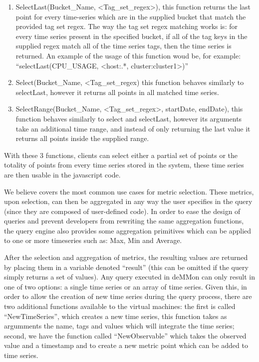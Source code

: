 \begin{enumerate}

    \item SelectLast(Bucket\_Name, <Tag\_set\_regex>), this function returns the last point for every time-series which are in the supplied bucket that match the provided tag set regex. The way the tag set regex matching works is: for every time series present in the specified bucket, if all of the tag keys in the supplied regex match all of the time series tags, then the time series is returned. An example of the usage of this function woud be, for example: ``selectLast(CPU\_USAGE, <host:.*, cluster:cluster1>)''
    
    \item Select(Bucket\_Name, <Tag\_set\_regex) this function behaves similarly to selectLast, however it returns all points in all matched time series.
    
    \item SelectRange(Bucket\_Name, <Tag\_set\_regex>, startDate, endDate), this function behaves similarly to select and selectLast, however its arguments take an additional time range, and instead of only returning the last value it returns all points inside the supplied range.
    
\end{enumerate}

With these 3 functions, clients can select either a partial set of points or the totality of points from every time series stored in the system, these time series are then usable in the javascript code.  

We believe covers the most common use cases for metric selection. These metrics, upon selection, can then be aggregated in any way the user specifies in the query (since they are composed of user-defined code). In order to ease the design of queries and prevent developers from rewriting the same aggregation functions, the query engine also provides some aggregation primitives which can be applied to one or more timeseries such as: Max, Min and Average.

After the selection and aggregation of metrics, the resulting values are returned by placing them in a variable denoted ``result'' (this can be omitted if the query simply returns a set of values). Any query executed in deMMon can only result in one of two options: a single time series or an array of time series. Given this, in order to allow the creation of new time series during the query process, there are two additional functions available to the virtual machines: the first is called ``NewTimeSeries'', which creates a new time series, this function takes as argumments the name, tags and values which will integrate the time series; second, we have the function called ``NewObservable'' which takes the observed value and a timestamp and  to create a new metric point which can be added to time series.


